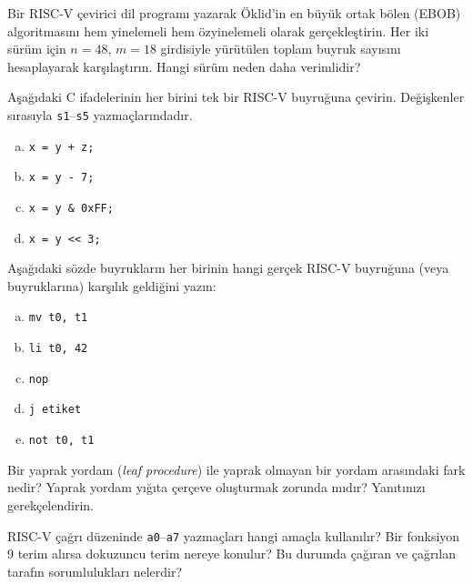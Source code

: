 \begin{alistirma}[\zor]
Bir RISC-V çevirici dil programı yazarak Öklid'in en büyük ortak bölen (EBOB) algoritmasını hem yinelemeli hem özyinelemeli olarak gerçekleştirin. Her iki sürüm için $n = 48$, $m = 18$ girdisiyle yürütülen toplam buyruk sayısını hesaplayarak karşılaştırın. Hangi sürüm neden daha verimlidir?
\end{alistirma}


\begin{alistirma}[\kolay]
Aşağıdaki C ifadelerinin her birini tek bir RISC-V buyruğuna çevirin. Değişkenler sırasıyla \texttt{s1}--\texttt{s5} yazmaçlarındadır.
\begin{enumerate}[(a)]
\item \texttt{x = y + z;}
\item \texttt{x = y - 7;}
\item \texttt{x = y \& 0xFF;}
\item \texttt{x = y << 3;}
\end{enumerate}
\end{alistirma}

\begin{alistirma}[\kolay]
Aşağıdaki sözde buyrukların her birinin hangi gerçek RISC-V buyruğuna (veya buyruklarına) karşılık geldiğini yazın:
\begin{enumerate}[(a)]
\item \texttt{mv t0, t1}
\item \texttt{li t0, 42}
\item \texttt{nop}
\item \texttt{j etiket}
\item \texttt{not t0, t1}
\end{enumerate}
\end{alistirma}

\begin{alistirma}[\kolay]
Bir yaprak yordam (\emph{leaf procedure}) ile yaprak olmayan bir yordam arasındaki fark nedir? Yaprak yordam yığıta çerçeve oluşturmak zorunda mıdır? Yanıtınızı gerekçelendirin.
\end{alistirma}

\begin{alistirma}[\kolay]
RISC-V çağrı düzeninde \texttt{a0}--\texttt{a7} yazmaçları hangi amaçla kullanılır? Bir fonksiyon 9 terim alırsa dokuzuncu terim nereye konulur? Bu durumda çağıran ve çağrılan tarafın sorumlulukları nelerdir?
\end{alistirma}

